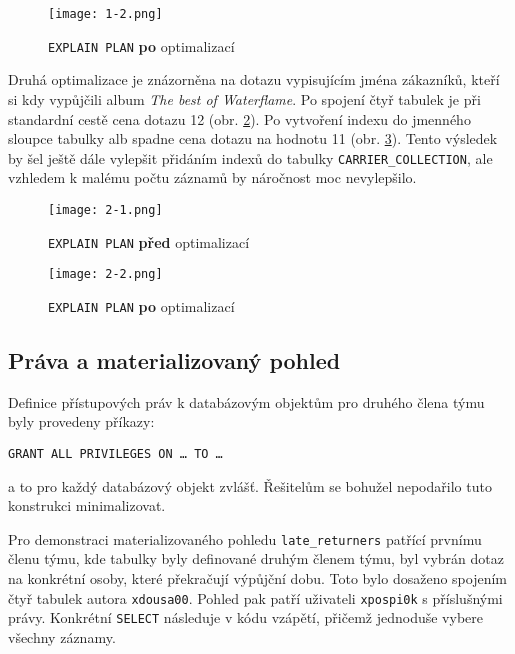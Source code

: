 \begin{figure}[h]
    \centering
    \caption{\texttt{EXPLAIN PLAN} \textbf{po} optimalizací}
    \label{fig:pic2}
    \texttt{[image: 1-2.png]}
\end{figure}


\newpage
Druhá optimalizace je znázorněna na dotazu vypisujícím jména zákazníků, kteří si kdy vypůjčili album \textit{The best of Waterflame}. 
Po spojení čtyř tabulek je při standardní cestě  cena dotazu 12 (obr. \ref{fig:pic3}). 
Po vytvoření indexu do jmenného sloupce tabulky alb spadne cena dotazu na hodnotu 11 (obr. \ref{fig:pic4}). 
Tento výsledek by šel ještě dále vylepšit přidáním indexů do tabulky \texttt{CARRIER\_COLLECTION}, 
ale vzhledem k malému počtu záznamů by náročnost moc nevylepšilo.


\begin{figure}[h]
    \centering
    \caption{\texttt{EXPLAIN PLAN} \textbf{před} optimalizací}
    \label{fig:pic3}
    \texttt{[image: 2-1.png]}
\end{figure}


\begin{figure}[h]
    \centering
    \caption{\texttt{EXPLAIN PLAN} \textbf{po} optimalizací}
    \label{fig:pic4}
    \texttt{[image: 2-2.png]}
\end{figure}



\newpage
\subsection{Práva a materializovaný pohled}
Definice přístupových práv k databázovým objektům pro druhého člena týmu byly provedeny příkazy:

\medskip
\noindent
\texttt{GRANT~ALL~PRIVILEGES~ON~\dots~TO~\dots}

\medskip
\noindent
a to pro každý databázový objekt zvlášť. Řešitelům se bohužel nepodařilo tuto konstrukci minimalizovat. 

Pro demonstraci materializovaného pohledu \texttt{late\_returners} patřící prvnímu členu týmu, 
kde tabulky byly definované druhým členem týmu, byl vybrán dotaz na konkrétní osoby, které překračují výpůjční dobu. 
Toto bylo dosaženo spojením čtyř tabulek autora \texttt{xdousa00}. Pohled pak patří uživateli \texttt{xpospi0k} s příslušnými právy. 
Konkrétní \texttt{SELECT} následuje v kódu vzápětí,  přičemž jednoduše vybere všechny záznamy.
